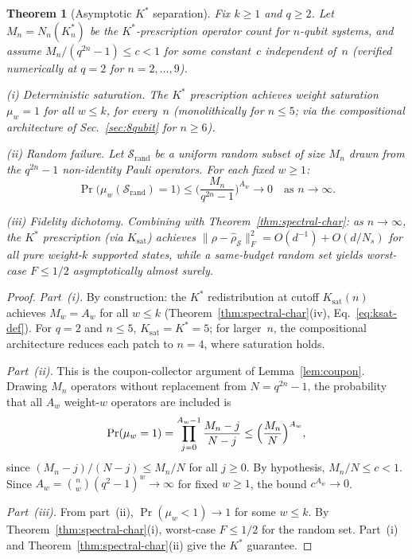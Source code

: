 \documentclass[twocolumn,prx,aps,superscriptaddress,longbibliography,floatfix]{revtex4-2}
\newtheorem{theorem}{Theorem}
\newcommand{\pclaim}[4]{}
\begin{document}
\pclaim{env:thm:asymptotic}{proved}{*}{thm:asymptotic}%
\begin{theorem}[Asymptotic $K^*$ separation]
\label{thm:asymptotic}
Fix $k \ge 1$ and $q \ge 2$.
Let $M_n = N_n(K^*_n)$ be the $K^*$-prescription operator
count for $n$-qubit systems, and assume
$M_n/(q^{2n}{-}1) \le c < 1$ for some constant~$c$
independent of~$n$ (verified numerically at
$q = 2$ for $n = 2, \ldots, 9$).

\textup{(i)} \emph{Deterministic saturation.}
The $K^*$ prescription achieves weight saturation
$\mu_w = 1$ for all $w \le k$, for every~$n$
(monolithically for $n \le 5$; via the compositional
architecture of Sec.~\ref{sec:8qubit} for $n \ge 6$).

\textup{(ii)} \emph{Random failure.}
Let $\mathcal{S}_{\mathrm{rand}}$ be a uniform random
subset of size $M_n$ drawn from the $q^{2n} - 1$
non-identity Pauli operators.  For each fixed
$w \ge 1$:
\begin{equation}\label{eq:random_failure}
  \Pr\!\bigl(\mu_w(\mathcal{S}_{\mathrm{rand}}) = 1\bigr)
  \le \biggl(\frac{M_n}{q^{2n} - 1}\biggr)^{\!A_w}
  \to 0 \quad\text{as } n \to \infty.
\end{equation}

\textup{(iii)} \emph{Fidelity dichotomy.}
Combining with Theorem~\ref{thm:spectral-char}:
as $n \to \infty$, the $K^*$ prescription (via
$K_{\mathrm{sat}}$) achieves
$\|\rho - \hat\rho_{\mathcal{S}}\|_F^2 = O(d^{-1}) + O(d/N_s)$
for all pure weight-$k$ supported states,
while a same-budget random set yields
worst-case $F \le 1/2$ asymptotically almost surely.
\end{theorem}

\begin{proof}
\emph{Part~(i).}
By construction: the $K^*$ redistribution at cutoff
$K_{\mathrm{sat}}(n)$ achieves $M_w = A_w$ for all $w \le k$
(Theorem~\ref{thm:spectral-char}(iv),
Eq.~\eqref{eq:ksat-def}).
For $q = 2$ and $n \le 5$, $K_{\mathrm{sat}} = K^* = 5$;
for larger~$n$, the compositional architecture reduces
each patch to $n = 4$, where saturation holds.

\emph{Part~(ii).}
This is the coupon-collector argument of
Lemma~\ref{lem:coupon}.  Drawing $M_n$ operators without
replacement from $N = q^{2n} - 1$, the probability that
all $A_w$ weight-$w$ operators are included is
\begin{equation}
  \Pr(\mu_w = 1)
  = \prod_{j=0}^{A_w - 1} \frac{M_n - j}{N - j}
  \le \Bigl(\frac{M_n}{N}\Bigr)^{A_w},
\end{equation}
since $(M_n - j)/(N - j) \le M_n / N$ for all
$j \ge 0$.  By hypothesis, $M_n/N \le c < 1$.
Since $A_w = \binom{n}{w}(q^2{-}1)^w \to \infty$ for
fixed $w \ge 1$, the bound $c^{A_w} \to 0$.

\emph{Part~(iii).}
From part~(ii), $\Pr(\mu_w < 1) \to 1$ for some
$w \le k$.  By Theorem~\ref{thm:spectral-char}(i),
worst-case $F \le 1/2$ for the random set.
Part~(i) and Theorem~\ref{thm:spectral-char}(ii) give
the $K^*$ guarantee.
\end{proof}
\end{document}
